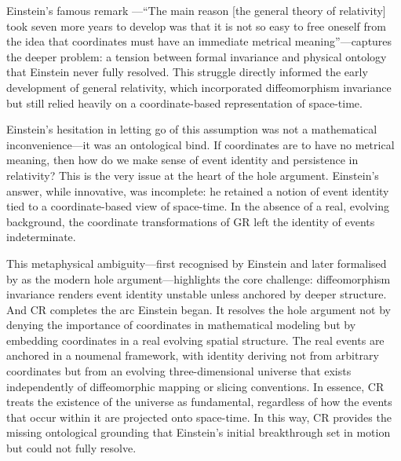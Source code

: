 \documentclass[12pt]{book}
\begin{document}
Einstein's famous remark \citep{schilpp1959}---``The main reason [the general theory of relativity] took seven more years to develop was that it is not so easy to free oneself from the idea that coordinates must have an immediate metrical meaning''---captures the deeper problem: a tension between formal invariance and physical ontology that Einstein never fully resolved. This struggle directly informed the early development of general relativity, which incorporated diffeomorphism invariance but still relied heavily on a coordinate-based representation of space-time.

Einstein's hesitation in letting go of this assumption was not a mathematical inconvenience---it was an ontological bind. If coordinates are to have no metrical meaning, then how do we make sense of event identity and persistence in relativity? This is the very issue at the heart of the hole argument. Einstein's answer, while innovative, was incomplete: he retained a notion of event identity tied to a coordinate-based view of space-time. In the absence of a real, evolving background, the coordinate transformations of GR left the identity of events indeterminate. 

This metaphysical ambiguity---first recognised by Einstein and later formalised by \citet{earman1987} as the modern hole argument---highlights the core challenge: diffeomorphism invariance renders event identity unstable unless anchored by deeper structure. And CR completes the arc Einstein began. It resolves the hole argument not by denying the importance of coordinates in mathematical modeling but by embedding coordinates in a real evolving spatial structure. The real events are anchored in a noumenal framework, with identity deriving not from arbitrary coordinates but from an evolving three-dimensional universe that exists independently of diffeomorphic mapping or slicing conventions. In essence, CR treats the existence of the universe as fundamental, regardless of how the events that occur within it are projected onto space-time. In this way, CR provides the missing ontological grounding that Einstein's initial breakthrough set in motion but could not fully resolve. 
\end{document}
